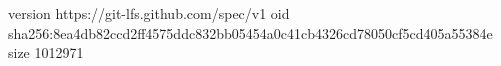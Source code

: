 version https://git-lfs.github.com/spec/v1
oid sha256:8ea4db82ccd2ff4575ddc832bb05454a0c41cb4326cd78050cf5cd405a55384e
size 1012971
